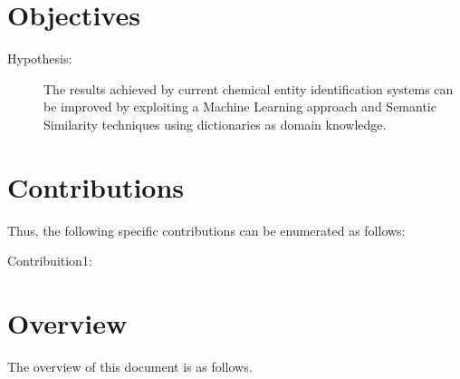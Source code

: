 

\section{Objectives}

\newcommand{\hypothesis}{
\begin{description}
	\item[Hypothesis:] The results achieved by current chemical entity identification systems can be improved by exploiting a Machine Learning approach and Semantic Similarity techniques using dictionaries as domain knowledge. 
\end{description}
}

\hypothesis


\section{Contributions}


Thus, the following specific contributions can be enumerated as follows:
\begin{description}
	\item[Contribuition1:] 
\end{description}


\section{Overview}

The overview of this document is as follows.



